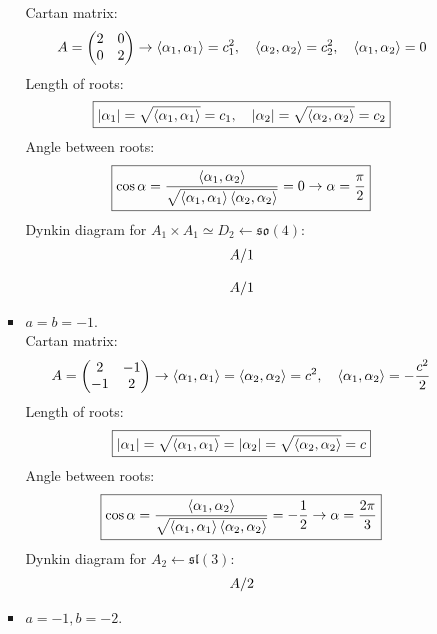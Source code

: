 \documentclass[12pt]{article}
\def\row#1/#2!{#1_{\IfStrEq{#2}{}{n}{#2}} & \dynkin{#1}{#2}\\}
\newcommand{\tble}[1]{
   \renewcommand*\do[1]{\row##1!}
   \[
      \begin{array}{ll}\docsvlist{#1}\end{array}
   \]
}
\theoremstyle{definition}
\begin{document}
\begin{enumerate}
\begin{itemize}
\begin{itemize}
            Cartan matrix:
            \begin{equation}
                A=\begin{pmatrix}
                    2 & 0\\
                    0 & 2
                \end{pmatrix}\rightarrow\braket{\alpha_1,\alpha_1}=c_1^2,\quad\braket{\alpha_2,\alpha_2}=c_2^2,\quad\braket{\alpha_1,\alpha_2}=0
            \end{equation}
            Length of roots:
            \begin{equation}
                \boxed{|\alpha_1|=\sqrt{\braket{\alpha_1,\alpha_1}}=c_1,\quad|\alpha_2|=\sqrt{\braket{\alpha_2,\alpha_2}}=c_2}
            \end{equation}
            Angle between roots:
            \begin{equation}
                \boxed{\cos\alpha=\frac{\braket{\alpha_1,\alpha_2}}{\sqrt{\braket{\alpha_1,\alpha_1}\braket{\alpha_2,\alpha_2}}}=0\rightarrow\alpha=\frac{\pi}{2}}
            \end{equation}
            Dynkin diagram for $A_1\times A_1\simeq D_2\leftarrow\mathfrak{so}(4)$: \tble{A/1}\tble{A/1}
            \item $a=b=-1$.\\
            Cartan matrix:
            \begin{equation}
                A=\begin{pmatrix}
                    2 & -1\\
                    -1 & 2
                \end{pmatrix}\rightarrow\braket{\alpha_1,\alpha_1}=\braket{\alpha_2,\alpha_2}=c^2,\quad\braket{\alpha_1,\alpha_2}=-\frac{c^2}{2}
            \end{equation}
            Length of roots:
            \begin{equation}
                \boxed{|\alpha_1|=\sqrt{\braket{\alpha_1,\alpha_1}}=|\alpha_2|=\sqrt{\braket{\alpha_2,\alpha_2}}=c}
            \end{equation}
            Angle between roots:
            \begin{equation}
                \boxed{\cos\alpha=\frac{\braket{\alpha_1,\alpha_2}}{\sqrt{\braket{\alpha_1,\alpha_1}\braket{\alpha_2,\alpha_2}}}=-\frac{1}{2}\rightarrow\alpha=\frac{2\pi}{3}}
            \end{equation}
            Dynkin diagram for $A_2\leftarrow\mathfrak{sl}(3)$: \tble{A/2}
            \item $a=-1, b=-2$.\\

\end{itemize}
\end{itemize}
\end{enumerate}
\end{document}
